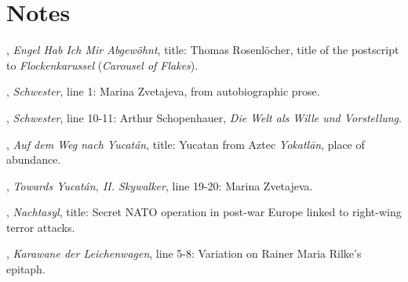\documentclass[11pt,twoside,final]{memoir}
\begin{document}

\setcounter{chapter}{0}







\chapter{Notes}

\thispagestyle{normalpage}
\normalsize

{\setlength{\parindent}{0pt}
\setlength{\parskip}{\onelineskip}

, \textit{Engel Hab Ich Mir Abgewöhnt}, title: Thomas Rosenlöcher, title of the postscript to \textit{Flockenkarussel} (\textit{Carousel of Flakes}).

, \textit{Schwester}, line 1: Marina Zvetajeva, from autobiographic prose.

, \textit{Schwester}, line 10-11: Arthur Schopenhauer, \textit{Die Welt als Wille und Vorstellung}.

, \textit{Auf dem Weg nach Yucatán}, title: Yucatan from Aztec \textit{Yokatlān}, place of abundance.

, \textit{Towards Yucatán, II. Skywalker}, line 19-20: Marina Zvetajeva.

, \textit{Nachtasyl}, title: Secret NATO operation in post-war Europe linked to right-wing terror attacks.

, \textit{Karawane der Leichenwagen}, line 5-8: Variation on Rainer Maria Rilke's epitaph.

}
\end{document}
